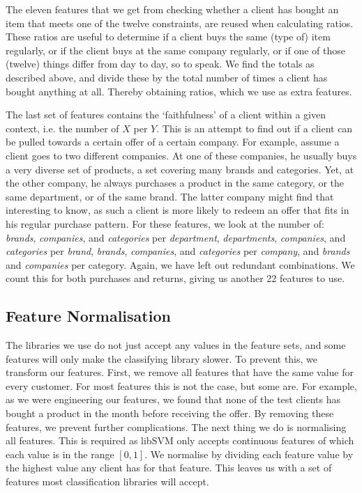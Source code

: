 \documentclass[a4paper]{jmlr}
\begin{document}
The eleven features that we get from checking whether a client has bought an item that meets one of the twelve constraints, are reused when calculating ratios. These ratios are useful to determine if a client buys the same (type of) item regularly, or if the client buys at the same company regularly, or if one of those (twelve) things differ from day to day, so to speak. We find the totals as described above, and divide these by the total number of times a client has bought anything at all. Thereby obtaining ratios, which we use as extra features.

The last set of features contains the `faithfulness' of a client within a given context, i.e. the number of $X$ per $Y$. This is an attempt to find out if a client can be pulled towards a certain offer of a certain company. For example, assume a client goes to two different companies. At one of these companies, he usually buys a very diverse set of products, a set covering many brands and categories. Yet, at the other company, he always purchases a product in the same category, or the same department, or of the same brand. The latter company might find that interesting to know, as such a client is more likely to redeem an offer that fits in his regular purchase pattern. For these features, we look at the number of: \emph{brands}, \emph{companies}, and \emph{categories} per \emph{department}, \emph{departments}, \emph{companies}, and \emph{categories} per \emph{brand}, \emph{brands}, \emph{companies}, and \emph{categories} per \emph{company}, and \emph{brands} and \emph{companies} per category. Again, we have left out redundant combinations. We count this for both purchases and returns, giving us another 22 features to use. 

\subsection{Feature Normalisation}
The libraries we use do not just accept any values in the feature sets, and some features will only make the classifying library slower. To prevent this, we transform our features. First, we remove all features that have the same value for every customer. For most features this is not the case, but some are. For example, as we were engineering our features, we found that none of the test clients has bought a product in the month before receiving the offer. By removing these features, we prevent further complications. The next thing we do is normalising all features. This is required as libSVM only accepts continuous features of which each value is in the range $[0,1]$. We normalise by dividing each feature value by the highest value any client has for that feature. This leaves us with a set of features most classification libraries will accept.
\end{document}

